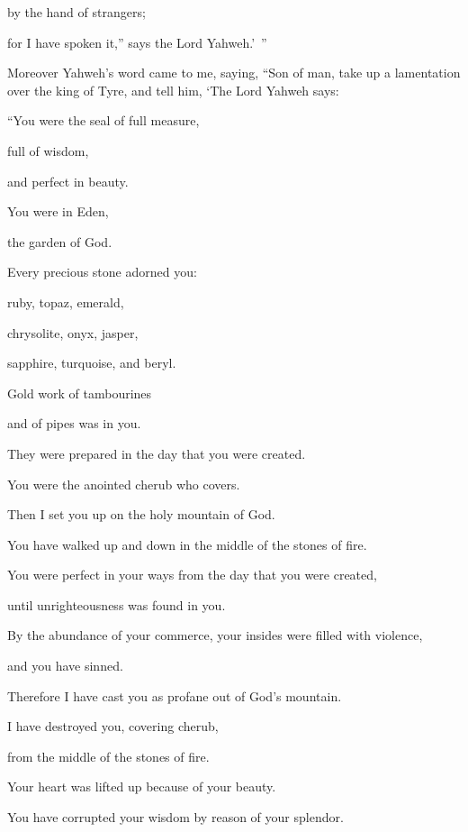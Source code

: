 {\par }{\QB by the hand of strangers;
\par }{\QB for I have spoken it,” says the Lord Yahweh.’ ”
\par }{\BB \par }{\PP {}Moreover Yahweh’s word came to me, saying,
“Son of man, take up a lamentation over the king of Tyre, and tell him, ‘The Lord Yahweh says:
\par }{\Q “You were the seal of full measure,
\par }{\QB full of wisdom,
\par }{\QB and perfect in beauty.
\par }{\Q {}You were in Eden,
\par }{\QB the garden of God.
\par }{\Q Every precious stone adorned you:
\par }{\QB ruby, topaz, emerald,
\par }{\QB chrysolite, onyx, jasper,
\par }{\QB sapphire, turquoise, and beryl.
\par }{\Q Gold work of tambourines
\par }{\QB and of pipes was in you.
\par }{\QB They were prepared in the day that you were created.
\par }{\Q {}You were the anointed cherub who covers.
\par }{\QB Then I set you up on the holy mountain of God.
\par }{\QB You have walked up and down in the middle of the stones of fire.
\par }{\Q {}You were perfect in your ways from the day that you were created,
\par }{\QB until unrighteousness was found in you.
\par }{\Q {}By the abundance of your commerce, your insides were filled with violence,
\par }{\QB and you have sinned.
\par }{\Q Therefore I have cast you as profane out of God’s mountain.
\par }{\QB I have destroyed you, covering cherub,
\par }{\QB from the middle of the stones of fire.
\par }{\Q {}Your heart was lifted up because of your beauty.
\par }{\QB You have corrupted your wisdom by reason of your splendor.
}
